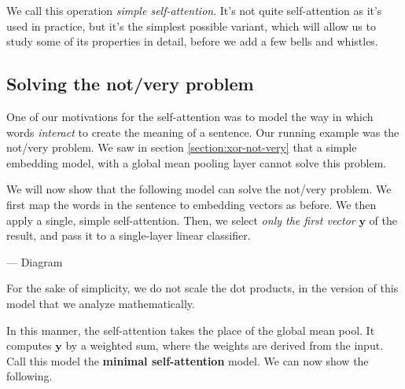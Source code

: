 \documentclass{pca}
\newenvironment{aside}{
	\setlength{\leftskip}{1em}\par\itshape
}{
	
	\setlength{\leftskip}{0em}\par
}
\newcommand{\mby}{\mathbold y}
\theoremstyle{theorem}
\theoremstyle{definition}
\theoremstyle{proof}
\begin{document}
We call this operation \emph{simple self-attention}. It's not quite self-attention as it's used in practice, but it's the simplest possible variant, which will allow us to study some of its properties in detail, before we add a few bells and whistles.


\subsection{Solving the not/very problem}

One of our motivations for the self-attention was to model the way in which words \emph{interact} to create the meaning of a sentence. Our running example was the not/very problem. We saw in section \ref{section:xor-not-very} that a simple embedding model, with a global mean pooling layer cannot solve this problem. 

We will now show that the following model can solve the not/very problem. We first map the words in the sentence to embedding vectors as before. We then apply a single, simple self-attention. Then, we select \emph{only the first vector} $\mby$ of the result, and pass it to a single-layer linear classifier.

--- Diagram

\begin{aside}
For the sake of simplicity, we do not scale the dot products, in the version of this model that we analyze mathematically.	
\end{aside}

In this manner, the self-attention takes the place of the global mean pool. It computes $\mby$ by a weighted sum, where the weights are derived from the input. Call this model the \textbf{minimal self-attention} model. We can now show the following.
\end{document}
